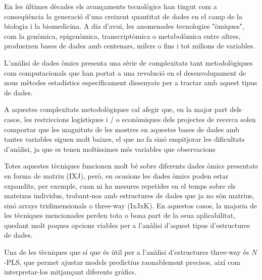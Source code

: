 
En les últimes dècades els avançaments tecnològics han tingut com a conseqüència la generació d'una creixent quantitat de dades en el camp de la biologia i la biomedicina. A dia d'avui, les anomenades tecnologies "òmiques", com la genòmica, epigenòmica, transcriptòmica o metabolòmica entre altres, produeixen bases de dades amb centenars, milers o fins i tot milions de variables. 

L'anàlisi de dades òmics presenta una sèrie de complexitats tant metodològiques com computacionals que han portat a una revolució en el desenvolupament de nous mètodes estadístics específicament dissenyats per a tractar amb aquest tipus de dades.

A aquestes complexitats metodològiques cal afegir que, en la major part dels casos, les restriccions logístiques i / o econòmiques dels projectes de recerca solen comportar que les magnituts de les mostres en aquestes bases de dades amb tantes variables siguen molt baixes, el que no fa sinó empitjorar les dificultats d'anàlisi, ja que es tenen moltíssimes més variables que observacions

Totes aquestes tècniques funcionen molt bé sobre diferents dades òmics presentats en forma de matriu (IXJ), però, en ocasions les dades òmics poden estar expandits, per exemple, cuan ni ha mesures repetides en el temps sobre els mateixos individus, trobant-nos amb estructures de dades que ja no són matrius, sinó arrays tridimensionals o three-way (IxJxK). En aquestos casos, la majoria de les tècniques mencionades perden tota o bona part de la seua aplicabilitat, quedant molt poques opcions viables per a l'anàlisi d'aquest tipus d'estructures de dades.

Una de les tècniques que sí que és útil per a l'anàlisi d'estructures three-way és $N$-PLS, que permet ajustar models predictius raonablement precisos, així com interpretar-los mitjançant diferents gràfics.

